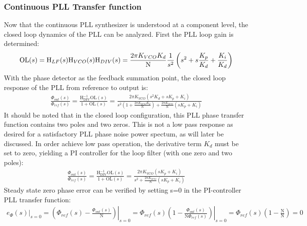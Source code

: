\subsubsection{Continuous PLL Transfer function}\label{cont_pll_tf}
Now that the continuous PLL synthesizer is understood at a component level, the closed loop dynamics of the PLL can be analyzed. First the PLL loop gain is determined:
\begin{equation}
	\mathrm{OL}(s) = \textnormal{H}_{LF}(s)\textnormal{H}_{VCO}(s)\textnormal{H}_{DIV}(s) = \frac{2\pi K_{VCO}K_d}{\mathrm{N}}\frac{1}{s^2}\left(s^2 + s\frac{K_p}{K_d} + \frac{K_i}{K_d}\right)
\end{equation}
With the phase detector as the feedback summation point, the closed loop response of the PLL from reference to output is:
\begin{align} \label{eq:pid_pll_tf}
	\frac{\Phi_{out}(s)}{\Phi_{ref}(s)} = \frac{\mathrm{H_{DIV}^{-1}OL}(s)}{1 + \mathrm{OL}(s)} = \frac{2\pi K_{VCO}\left(s^2K_d + sK_p + K_i\right)}{s^2\left(1 + \frac{2\pi K_{VCO}K_d}{\mathrm{N}}\right) + \frac{2\pi K_{VCO}}{\mathrm{N}}\left(sK_p + K_i\right)}
\end{align}
It should be noted that in the closed loop configuration, this PLL phase transfer function contains two poles and two zeros. This is not a low pass response as desired for a satisfactory PLL phase noise power spectum, as will later be discussed. In order achieve low pass operation, the derivative term $K_d$ must be set to zero, yielding a PI controller for the loop filter (with one zero and two poles):
\begin{align} \label{eq:full_pi_pll_tf}
	\frac{\Phi_{out}(s)}{\Phi_{ref}(s)} = \frac{\mathrm{H_{DIV}^{-1}OL}(s)}{1 + \mathrm{OL}(s)} = \frac{2\pi K_{VCO}\left(sK_p + K_i\right)}{s^2 + \frac{2\pi K_{VCO}}{\mathrm{N}}\left(sK_p + K_i\right)}
\end{align}
Steady state zero phase error can be verified by setting s=0 in the PI-controller PLL transfer function:
\begin{align}
	\left.e_\Phi(s)\right\vert_{s=0} = \left.\left(\Phi_{ref}(s) - \frac{\Phi_{out}(s)}{\mathrm{N}}\right)\right\vert_{s=0} = \left.\Phi_{ref}(s)\left(1 - \frac{\Phi_{out}(s)}{\mathrm{N}\Phi_{ref}(s)}\right)\right\vert_{s=0} = \Phi_{ref}(s)\left(1 - \frac{\mathrm{N}}{\mathrm{N}}\right) = 0
\end{align}
